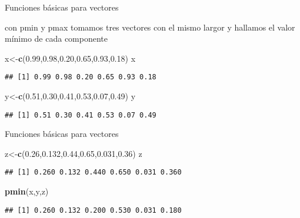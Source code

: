\documentclass[ignorenonframetext,]{beamer}
\newenvironment{Shaded}{\begin{snugshade}}{\end{snugshade}}
\newcommand{\KeywordTok}[1]{\textcolor[rgb]{0.13,0.29,0.53}{\textbf{#1}}}
\newcommand{\FloatTok}[1]{\textcolor[rgb]{0.00,0.00,0.81}{#1}}
\newcommand{\NormalTok}[1]{#1}
\begin{document}
\begin{frame}[fragile]{Funciones básicas para vectores}

con pmin y pmax tomamos tres vectores con el mismo largor y hallamos el
valor mínimo de cada componente

\begin{Shaded}
\begin{Highlighting}[]
\NormalTok{x<-}\KeywordTok{c}\NormalTok{(}\FloatTok{0.99}\NormalTok{,}\FloatTok{0.98}\NormalTok{,}\FloatTok{0.20}\NormalTok{,}\FloatTok{0.65}\NormalTok{,}\FloatTok{0.93}\NormalTok{,}\FloatTok{0.18}\NormalTok{)}
\NormalTok{x}
\end{Highlighting}
\end{Shaded}

\begin{verbatim}
## [1] 0.99 0.98 0.20 0.65 0.93 0.18
\end{verbatim}

\begin{Shaded}
\begin{Highlighting}[]
\NormalTok{y<-}\KeywordTok{c}\NormalTok{(}\FloatTok{0.51}\NormalTok{,}\FloatTok{0.30}\NormalTok{,}\FloatTok{0.41}\NormalTok{,}\FloatTok{0.53}\NormalTok{,}\FloatTok{0.07}\NormalTok{,}\FloatTok{0.49}\NormalTok{)}
\NormalTok{y}
\end{Highlighting}
\end{Shaded}

\begin{verbatim}
## [1] 0.51 0.30 0.41 0.53 0.07 0.49
\end{verbatim}

\end{frame}

\begin{frame}[fragile]{Funciones básicas para vectores}

\begin{Shaded}
\begin{Highlighting}[]
\NormalTok{z<-}\KeywordTok{c}\NormalTok{(}\FloatTok{0.26}\NormalTok{,}\FloatTok{0.132}\NormalTok{,}\FloatTok{0.44}\NormalTok{,}\FloatTok{0.65}\NormalTok{,}\FloatTok{0.031}\NormalTok{,}\FloatTok{0.36}\NormalTok{)}
\NormalTok{z}
\end{Highlighting}
\end{Shaded}

\begin{verbatim}
## [1] 0.260 0.132 0.440 0.650 0.031 0.360
\end{verbatim}

\begin{Shaded}
\begin{Highlighting}[]
\KeywordTok{pmin}\NormalTok{(x,y,z)}
\end{Highlighting}
\end{Shaded}

\begin{verbatim}
## [1] 0.260 0.132 0.200 0.530 0.031 0.180
\end{verbatim}

\end{frame}
\end{document}
